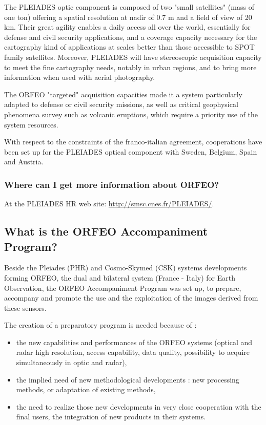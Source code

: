 The PLEIADES optic component is composed of two "small satellites"
(mass of one ton) offering a spatial resolution at nadir of 0.7 m and
a field of view of 20 km. Their great agility enables a daily access
all over the world, essentially for defense and civil security
applications, and a coverage capacity necessary for the cartography
kind of applications at scales better than those accessible to SPOT
family satellites. Moreover, PLEIADES will have stereoscopic
acquisition capacity to meet the fine cartography needs, notably in
urban regions, and to bring more information when used with aerial
photography.

The ORFEO "targeted" acquisition capacities made it a system
particularly adapted to defense or civil security missions, as well as
critical geophysical phenomena survey such as volcanic eruptions,
which require a priority use of the system resources.


With respect to the constraints of the franco-italian agreement,
cooperations have been set up for the PLEIADES optical component with
Sweden, Belgium, Spain and Austria.

\subsubsection{Where can I get more information about ORFEO?}
At the PLEIADES HR web site: \url{http://smsc.cnes.fr/PLEIADES/}.

\subsection{What is the ORFEO Accompaniment Program?}
Beside the Pleiades (PHR) and Cosmo-Skymed (CSK) systems developments forming ORFEO, the dual and bilateral system (France - Italy) for Earth Observation, the ORFEO Accompaniment Program was set up, to prepare, accompany and promote the use and the exploitation of the images derived from these sensors.

The creation of a preparatory program is needed because of :
\begin{itemize}
  \item  the new capabilities and performances of the ORFEO systems (optical and radar high resolution, access capability, data quality, possibility to acquire simultaneously in optic and radar),
  \item the implied need of new methodological developments : new processing methods, or adaptation of existing methods,
  \item the need to realize those new developments in very close cooperation with the final users, the integration of new products in their systems.
\end{itemize}


